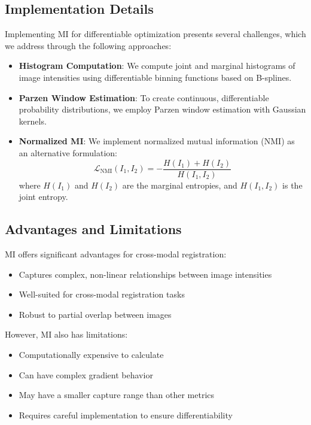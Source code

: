 \subsection{Implementation Details}

Implementing MI for differentiable optimization presents several challenges, which we address through the following approaches:

\begin{itemize}
    \item \textbf{Histogram Computation}: We compute joint and marginal histograms of image intensities using differentiable binning functions based on B-splines.
    
    \item \textbf{Parzen Window Estimation}: To create continuous, differentiable probability distributions, we employ Parzen window estimation with Gaussian kernels.
    
    \item \textbf{Normalized MI}: We implement normalized mutual information (NMI) as an alternative formulation:
    \begin{equation}
        \mathcal{L}_{\text{NMI}}(I_1, I_2) = -\frac{H(I_1) + H(I_2)}{H(I_1, I_2)}
    \end{equation}
    where $H(I_1)$ and $H(I_2)$ are the marginal entropies, and $H(I_1, I_2)$ is the joint entropy.
\end{itemize}

\subsection{Advantages and Limitations}

MI offers significant advantages for cross-modal registration:
\begin{itemize}
    \item Captures complex, non-linear relationships between image intensities
    \item Well-suited for cross-modal registration tasks \parencite{mi2003}
    \item Robust to partial overlap between images
\end{itemize}

However, MI also has limitations:
\begin{itemize}
    \item Computationally expensive to calculate
    \item Can have complex gradient behavior
    \item May have a smaller capture range than other metrics
    \item Requires careful implementation to ensure differentiability
\end{itemize}

